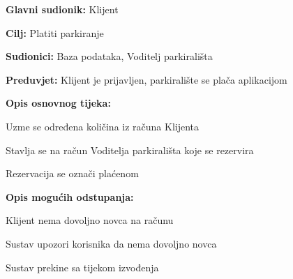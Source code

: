 \noindent {}
\begin{packed_item}
	
	\item \textbf{Glavni sudionik: }Klijent
	\item  \textbf{Cilj:} Platiti parkiranje
	\item  \textbf{Sudionici:} Baza podataka, Voditelj parkirališta
	\item  \textbf{Preduvjet:} Klijent je prijavljen, parkiralište se plača aplikacijom
	\item  \textbf{Opis osnovnog tijeka:}
	
	\item[] \begin{packed_enum}
		
		\item Uzme se određena količina iz računa Klijenta
		\item Stavlja se na račun Voditelja parkirališta koje se rezervira
		\item Rezervacija se označi plaćenom 
		
		
	\end{packed_enum}
	
	\item  \textbf{Opis mogućih odstupanja:}
	
	\item[] \begin{packed_item}
		
		\item[1.a] Klijent nema dovoljno novca na računu
		\item[] \begin{packed_enum}
			
			\item Sustav upozori korisnika da nema dovoljno novca
			\item Sustav prekine sa tijekom izvođenja
			
			
		\end{packed_enum}
		
		
	\end{packed_item}	
	
\end{packed_item}

